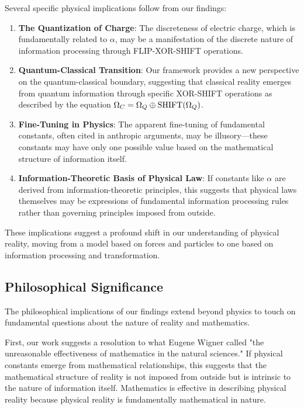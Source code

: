 Several specific physical implications follow from our findings:

\begin{enumerate}
    \item \textbf{The Quantization of Charge}: The discreteness of electric charge, which is fundamentally related to $\alpha$, may be a manifestation of the discrete nature of information processing through FLIP-XOR-SHIFT operations.
    
    \item \textbf{Quantum-Classical Transition}: Our framework provides a new perspective on the quantum-classical boundary, suggesting that classical reality emerges from quantum information through specific XOR-SHIFT operations as described by the equation $\Omega_C = \Omega_Q \oplus \text{SHIFT}(\Omega_Q)$.
    
    \item \textbf{Fine-Tuning in Physics}: The apparent fine-tuning of fundamental constants, often cited in anthropic arguments, may be illusory—these constants may have only one possible value based on the mathematical structure of information itself.
    
    \item \textbf{Information-Theoretic Basis of Physical Law}: If constants like $\alpha$ are derived from information-theoretic principles, this suggests that physical laws themselves may be expressions of fundamental information processing rules rather than governing principles imposed from outside.
\end{enumerate}

These implications suggest a profound shift in our understanding of physical reality, moving from a model based on forces and particles to one based on information processing and transformation.

\subsection{Philosophical Significance}

The philosophical implications of our findings extend beyond physics to touch on fundamental questions about the nature of reality and mathematics.

First, our work suggests a resolution to what Eugene Wigner called "the unreasonable effectiveness of mathematics in the natural sciences." If physical constants emerge from mathematical relationships, this suggests that the mathematical structure of reality is not imposed from outside but is intrinsic to the nature of information itself. Mathematics is effective in describing physical reality because physical reality is fundamentally mathematical in nature.

